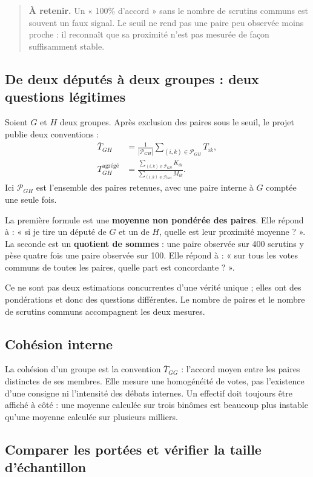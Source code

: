 \documentclass[11pt,a4paper]{article}
\newcommand{\important}[1]{\begin{quote}\small\color{blue!55!black}\textbf{À retenir.} #1\end{quote}}
\begin{document}
\important{Un « 100\% d'accord » sans le nombre de scrutins communs est souvent
un faux signal. Le seuil ne rend pas une paire peu observée moins proche : il
reconnaît que sa proximité n'est pas mesurée de façon suffisamment stable.}

\subsection{De deux députés à deux groupes : deux questions légitimes}

Soient $G$ et $H$ deux groupes. Après exclusion des paires sous le seuil, le
projet publie deux conventions :
\begin{align*}
 \overline T_{GH}&=\frac{1}{|\mathcal P_{GH}|}
 \sum_{(i,k)\in\mathcal P_{GH}}T_{ik},\\
 T^{\mathrm{agrégé}}_{GH}&=
 \frac{\sum_{(i,k)\in\mathcal P_{GH}}K_{ik}}
 {\sum_{(i,k)\in\mathcal P_{GH}}M_{ik}}.
\end{align*}
Ici $\mathcal P_{GH}$ est l'ensemble des paires retenues, avec une paire interne
à $G$ comptée une seule fois.

La première formule est une \textbf{moyenne non pondérée des paires}. Elle
répond à : « si je tire un député de $G$ et un de $H$, quelle est leur proximité
moyenne ? ». La seconde est un \textbf{quotient de sommes} : une paire observée
sur 400 scrutins y pèse quatre fois une paire observée sur 100. Elle répond à :
« sur tous les votes communs de toutes les paires, quelle part est concordante ? ».

Ce ne sont pas deux estimations concurrentes d'une vérité unique ; elles ont des
pondérations et donc des questions différentes. Le nombre de paires et le
nombre de scrutins communs accompagnent les deux mesures.

\subsection{Cohésion interne}

La cohésion d'un groupe est la convention $\overline T_{GG}$ : l'accord moyen
entre les paires distinctes de ses membres. Elle mesure une homogénéité de votes,
pas l'existence d'une consigne ni l'intensité des débats internes. Un effectif
doit toujours être affiché à côté : une moyenne calculée sur trois binômes est
beaucoup plus instable qu'une moyenne calculée sur plusieurs milliers.

\subsection{Comparer les portées et vérifier la taille d'échantillon}
\end{document}
